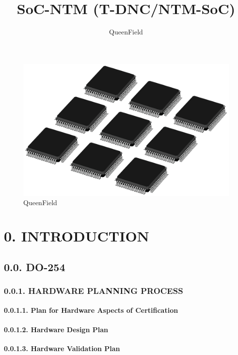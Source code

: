 \documentclass[]{article}
\title{SoC-NTM (T-DNC/NTM-SoC)}
\author{QueenField}
\date{}
\let\oldparagraph\paragraph
\renewcommand{\paragraph}[1]{\oldparagraph{#1}\mbox{}}
\begin{document}
\maketitle

\begin{figure}
\centering
\includegraphics{../icon.jpg}
\caption{QueenField}
\end{figure}

\section{0. INTRODUCTION}\label{introduction}

\subsection{0.0. DO-254}\label{do-254}

\subsubsection{0.0.1. HARDWARE PLANNING
PROCESS}\label{hardware-planning-process}

\paragraph{0.0.1.1. Plan for Hardware Aspects of
Certification}\label{plan-for-hardware-aspects-of-certification}

\paragraph{0.0.1.2. Hardware Design Plan}\label{hardware-design-plan}

\paragraph{0.0.1.3. Hardware Validation
Plan}\label{hardware-validation-plan}
\end{document}

